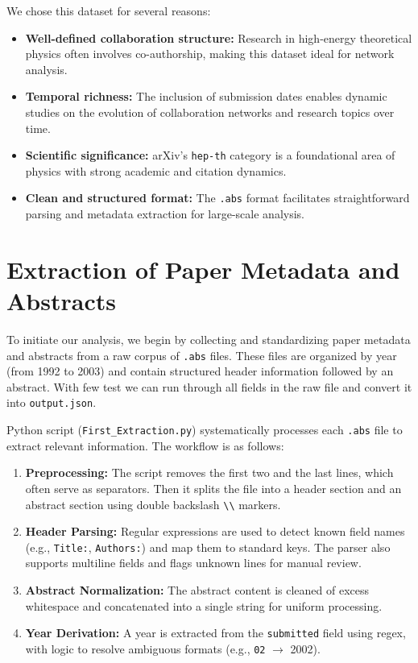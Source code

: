 \documentclass[12pt]{article}
\begin{document}
We chose this dataset for several reasons:
\begin{itemize}
    \item \textbf{Well-defined collaboration structure:} Research in high-energy theoretical physics often involves co-authorship, making this dataset ideal for network analysis.
    \item \textbf{Temporal richness:} The inclusion of submission dates enables dynamic studies on the evolution of collaboration networks and research topics over time.
    \item \textbf{Scientific significance:} arXiv’s \texttt{hep-th} category is a foundational area of physics with strong academic and citation dynamics.
    \item \textbf{Clean and structured format:} The \texttt{.abs} format facilitates straightforward parsing and metadata extraction for large-scale analysis.
\end{itemize}


\section{Extraction of Paper Metadata and Abstracts}

To initiate our analysis, we begin by collecting and standardizing paper metadata and abstracts from a raw corpus of \texttt{.abs} files. These files are organized by year (from 1992 to 2003) and contain structured header information followed by an abstract. With few test we can run through all fields in the raw file and convert it into \texttt{output.json}.

Python script (\texttt{First\_Extraction.py}) systematically processes each \texttt{.abs} file to extract relevant information. The workflow is as follows:

\begin{enumerate}
    \item \textbf{Preprocessing:} The script removes the first two and the last lines, which often serve as separators. Then it splits the file into a header section and an abstract section using double backslash \texttt{\textbackslash\textbackslash} markers.

    \item \textbf{Header Parsing:} Regular expressions are used to detect known field names (e.g., \texttt{Title:}, \texttt{Authors:}) and map them to standard keys. The parser also supports multiline fields and flags unknown lines for manual review.

    \item \textbf{Abstract Normalization:} The abstract content is cleaned of excess whitespace and concatenated into a single string for uniform processing.

    \item \textbf{Year Derivation:} A year is extracted from the \texttt{submitted} field using regex, with logic to resolve ambiguous formats (e.g., \texttt{02} $\rightarrow$ 2002).
\end{enumerate}
\end{document}
